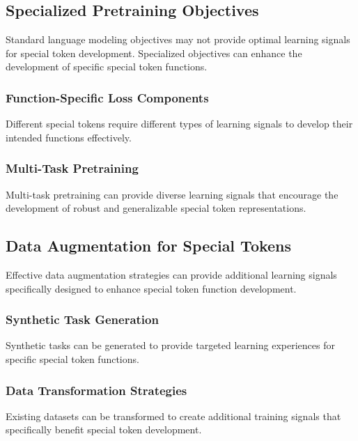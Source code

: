 \subsection{Specialized Pretraining Objectives}

Standard language modeling objectives may not provide optimal learning signals for special token development. Specialized objectives can enhance the development of specific special token functions.

\subsubsection{Function-Specific Loss Components}

Different special tokens require different types of learning signals to develop their intended functions effectively.

\subsubsection{Multi-Task Pretraining}

Multi-task pretraining can provide diverse learning signals that encourage the development of robust and generalizable special token representations.

\subsection{Data Augmentation for Special Tokens}

Effective data augmentation strategies can provide additional learning signals specifically designed to enhance special token function development.

\subsubsection{Synthetic Task Generation}

Synthetic tasks can be generated to provide targeted learning experiences for specific special token functions.

\subsubsection{Data Transformation Strategies}

Existing datasets can be transformed to create additional training signals that specifically benefit special token development.